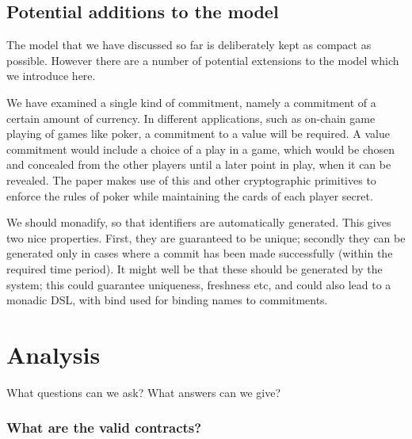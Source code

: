 \documentclass[
      acmsmall
    , screen
    , review=true
  ]{acmart}
\begin{document}
\subsection{Potential additions to the model}

The model that we have discussed so far is deliberately kept as compact as possible. However there are a number of potential extensions to the model which we introduce here. 

We have examined a single kind of commitment, namely a commitment of a certain amount of currency. In different 
applications, such as on-chain game playing of games like poker, a commitment to a value will be required. A value 
commitment would include a choice of a play in a game, which would be chosen and concealed from the other players until 
a later point in play, when it can be revealed. The paper \cite{kumaresan2015use} makes use of this and other 
cryptographic primitives to enforce the rules of poker while maintaining the cards of each player secret.

We should monadify, so that identifiers are automatically generated. This gives two nice properties. First, they are guaranteed to be unique; secondly they can be generated only in cases where a commit has been made successfully (within the required time period). It might well be that these should be generated by the system; this could guarantee uniqueness, freshness etc, and could also lead to a monadic DSL, with bind used for binding names to commitments.

\section{Analysis}
What questions can we ask? What answers can we give?


\subsubsection{What are the valid contracts?}
\end{document}
